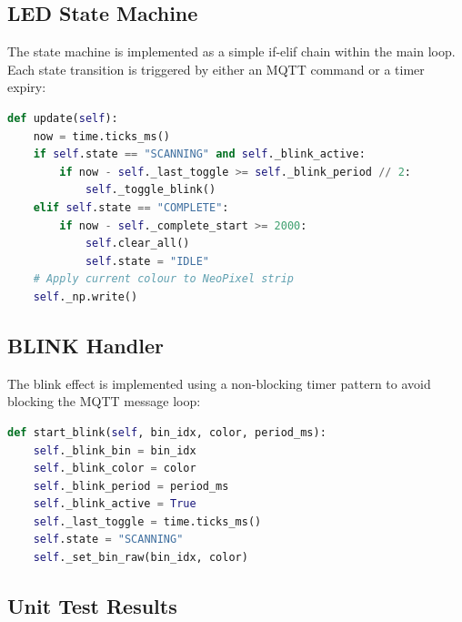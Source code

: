 \subsection{LED State Machine}
\label{sec:led-sm}

The state machine is implemented as a simple if-elif chain within the main loop. Each state transition is triggered by either an MQTT command or a timer expiry:

\begin{lstlisting}[language=Python, caption=LED state machine main loop, label=lst:state-machine]
def update(self):
    now = time.ticks_ms()
    if self.state == "SCANNING" and self._blink_active:
        if now - self._last_toggle >= self._blink_period // 2:
            self._toggle_blink()
    elif self.state == "COMPLETE":
        if now - self._complete_start >= 2000:
            self.clear_all()
            self.state = "IDLE"
    # Apply current colour to NeoPixel strip
    self._np.write()
\end{lstlisting}

\subsection{BLINK Handler}
\label{sec:blink-handler}

The blink effect is implemented using a non-blocking timer pattern to avoid blocking the MQTT message loop:

\begin{lstlisting}[language=Python, caption=Non-blocking blink handler, label=lst:blink]
def start_blink(self, bin_idx, color, period_ms):
    self._blink_bin = bin_idx
    self._blink_color = color
    self._blink_period = period_ms
    self._blink_active = True
    self._last_toggle = time.ticks_ms()
    self.state = "SCANNING"
    self._set_bin_raw(bin_idx, color)
\end{lstlisting}

\subsection{Unit Test Results}
\label{sec:fw-unit-tests}

